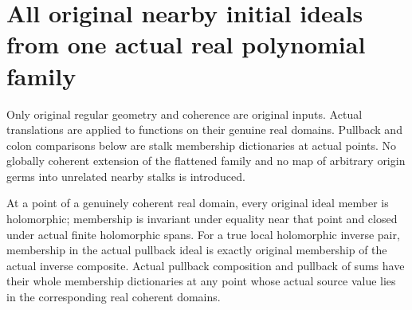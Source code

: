 \section{All original nearby initial ideals from one actual real polynomial family}

Only original regular geometry and coherence are original inputs. Actual
translations are applied to functions on their genuine real domains.
Pullback and colon comparisons below are stalk membership dictionaries at
actual points. No globally coherent extension of the flattened family and
no map of arbitrary origin germs into unrelated nearby stalks is introduced.

\begin{lemma}
\label{hir:real-domain-local-membership-inverse-pullback-calculus}
\leanok
At a point of a genuinely coherent real domain, every original ideal member
is holomorphic; membership is invariant under equality near that point and
closed under actual finite holomorphic spans. For a true local holomorphic
inverse pair, membership in the actual pullback ideal is exactly original
membership of the actual inverse composite. Actual pullback composition
and pullback of sums have their whole membership dictionaries at any point
whose actual source value lies in the corresponding real coherent domains.
\end{lemma}
